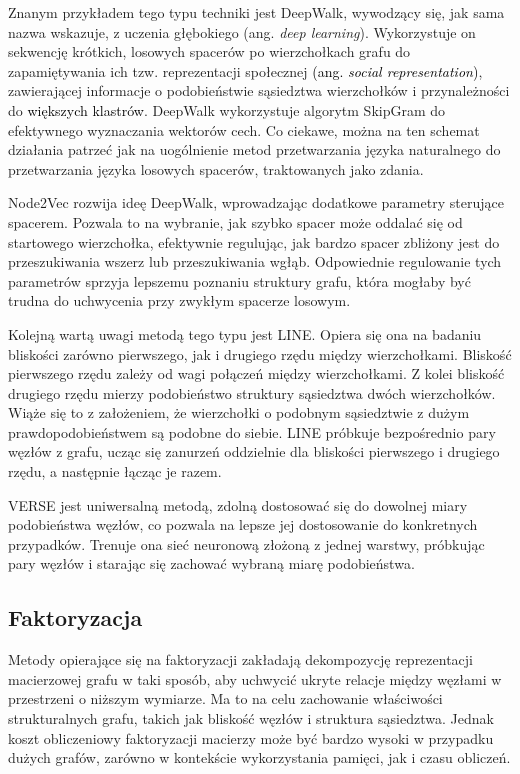         Znanym przykładem tego typu techniki jest DeepWalk\cite{Perozzi_Al-Rfou_Skiena_2014}, wywodzący się, jak sama nazwa wskazuje, z uczenia głębokiego (ang. \textit{deep learning}). Wykorzystuje on sekwencję krótkich, losowych spacerów po wierzchołkach grafu do zapamiętywania ich tzw. reprezentacji społecznej \textcolor{black}{(ang. \textit{social representation})}, zawierającej informacje o podobieństwie sąsiedztwa wierzchołków i przynależności do \textcolor{black}{większych klastrów}. DeepWalk wykorzystuje algorytm SkipGram\cite{mikolov2013efficient} do efektywnego wyznaczania wektorów cech. Co ciekawe, można na ten schemat działania patrzeć jak na uogólnienie metod przetwarzania języka naturalnego do przetwarzania języka losowych spacerów, traktowanych jako zdania.
        
        Node2Vec\cite{Grover_Leskovec_2016} rozwija ideę DeepWalk, wprowadzając dodatkowe parametry sterujące spacerem. Pozwala to na wybranie, jak szybko spacer może oddalać się od startowego wierzchołka, efektywnie regulując, jak bardzo spacer zbliżony jest do przeszukiwania wszerz lub przeszukiwania wgłąb. Odpowiednie regulowanie tych parametrów sprzyja lepszemu poznaniu struktury grafu, która mogłaby być trudna do uchwycenia przy zwykłym spacerze losowym. 
        
        Kolejną wartą uwagi metodą tego typu jest LINE\cite{Tang_Qu_Wang_Zhang_Yan_Mei_2015}. Opiera się ona na badaniu bliskości zarówno pierwszego, jak i drugiego rzędu między wierzchołkami. Bliskość pierwszego rzędu zależy od wagi połączeń między wierzchołkami. Z kolei bliskość drugiego rzędu mierzy podobieństwo struktury sąsiedztwa dwóch wierzchołków. Wiąże się to z założeniem, że wierzchołki o podobnym sąsiedztwie z dużym prawdopodobieństwem są podobne do siebie. LINE próbkuje bezpośrednio pary węzłów z grafu, ucząc się zanurzeń oddzielnie dla bliskości pierwszego i drugiego rzędu, a następnie łącząc je razem. 
        
        VERSE\cite{Tsitsulin_Mottin_Karras_Müller_2018} jest uniwersalną metodą, zdolną dostosować się do dowolnej miary podobieństwa węzłów, co pozwala na lepsze jej dostosowanie do konkretnych przypadków. Trenuje ona sieć neuronową złożoną z jednej warstwy, próbkując pary węzłów i starając się zachować wybraną miarę podobieństwa.

    \subsection{Faktoryzacja}
        Metody opierające się na faktoryzacji zakładają dekompozycję reprezentacji macierzowej grafu w taki sposób, aby uchwycić ukryte relacje między węzłami w przestrzeni o niższym wymiarze. Ma to na celu zachowanie właściwości strukturalnych grafu, takich jak bliskość węzłów i struktura sąsiedztwa. Jednak koszt obliczeniowy faktoryzacji macierzy może być bardzo wysoki w przypadku dużych grafów, zarówno w kontekście wykorzystania pamięci, jak i czasu obliczeń.

